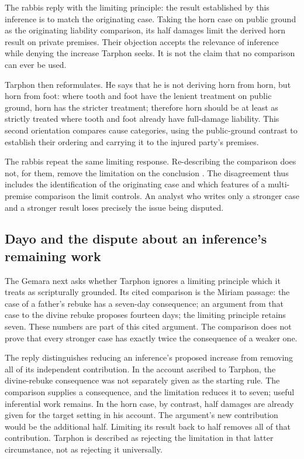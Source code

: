 The rabbis reply with the limiting principle: the result established
by this inference is to match the originating case. Taking the
horn case on public ground as the originating liability comparison,
its half damages limit the derived horn result on private premises.
Their objection accepts the relevance of inference while denying
the increase Tarphon seeks. It is not the claim that no comparison
can ever be used.

Tarphon then reformulates. He says that he is not deriving horn from
horn, but horn from foot: where tooth and foot have the lenient
treatment on public ground, horn has the stricter treatment; therefore
horn should be at least as strictly treated where tooth and foot
already have full-damage liability. This second orientation compares
cause categories, using the public-ground contrast to establish their
ordering and carrying it to the injured party's premises.

The rabbis repeat the same limiting response. Re-describing the
comparison does not, for them, remove the limitation on the conclusion
\parencite[pp.~50--51]{RodkinsonBabaKamaCopyright1900}.
The disagreement thus includes the identification of the originating
case and which features of a multi-premise comparison the limit
controls. An analyst who writes only a stronger case and a stronger
result loses precisely the issue being disputed.

\subsection{Dayo and the dispute about an inference's remaining work}
\label{sec:p18-talmudic-dayo}

The Gemara next asks whether Tarphon ignores a limiting principle
which it treats as scripturally grounded. Its cited comparison is
the Miriam passage: the case of a father's rebuke has a seven-day
consequence; an argument from that case to the divine rebuke proposes
fourteen days; the limiting principle retains seven. These numbers
are part of this cited argument. The comparison does not prove that
every stronger case has exactly twice the consequence of a weaker one.

The reply distinguishes reducing an inference's proposed increase
from removing all of its independent contribution. In the account
ascribed to Tarphon, the divine-rebuke consequence was not separately
given as the starting rule. The comparison supplies a consequence,
and the limitation reduces it to seven; useful inferential work
remains. In the horn case, by contrast, half damages are already
given for the target setting in his account. The argument's new
contribution would be the additional half. Limiting its result back
to half removes all of that contribution. Tarphon is described as
rejecting the limitation in that latter circumstance, not as
rejecting it universally.

